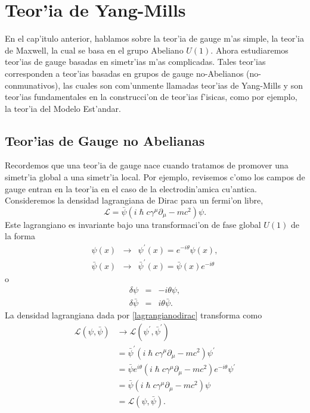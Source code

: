 \chapter{Teor'ia de Yang-Mills}
En el cap'itulo anterior, hablamos sobre la teor'ia de gauge m'as simple, la teor'ia de Maxwell, la cual se basa en el grupo Abeliano $U(1)$.
Ahora estudiaremos teor'ias de gauge basadas en simetr'ias m'as complicadas. Tales teor'ias corresponden a teor'ias basadas en grupos de gauge no-Abelianos (no-conmunativos), las cuales son com'unmente llamadas teor'ias de Yang-Mills y son teor'ias fundamentales en la construcci'on de teor'ias f'isicas, como por ejemplo, la teor'ia del Modelo Est'andar.
\section{Teor'ias de Gauge no Abelianas}
Recordemos que una teor'ia de gauge  nace cuando tratamos de promover una simetr'ia global a una simetr'ia local. Por ejemplo, revisemos c'omo los campos de gauge entran en la teor'ia en el caso de la electrodin'amica cu'antica.
Consideremos  la densidad lagrangiana de Dirac para un fermi'on libre,
\begin{equation}
\mathcal{L}=\bar{\psi}\left(i\hslash c\gamma^\mu \partial_\mu -mc^2\right)\psi. \label{lagrangianodirac}
\end{equation}
Este lagrangiano es invariante bajo una transformaci'on de fase global $U(1)$ de la forma
\begin{eqnarray}
\psi(x)&\rightarrow & \psi^\prime (x)=e^{-i\theta}\psi(x), \\
\bar{\psi}(x)&\rightarrow & \bar{\psi}^\prime (x)=\bar{\psi}(x) e^{-i\theta}
\end{eqnarray}
o
\begin{eqnarray}
\delta \psi&=&-i\theta \psi, \\
\delta\bar{\psi}&=&i\theta\bar{\psi}.
\end{eqnarray}
La densidad  lagrangiana dada por \eqref{lagrangianodirac} transforma como
\begin{equation}
\begin{aligned}
\mathcal{L}(\psi ,\bar{\psi})&\rightarrow  \mathcal{L}(\psi^\prime,\bar{\psi}^\prime) \\
&=\bar{\psi}^\prime\left(i\hslash c\gamma^\mu \partial_\mu -mc^2\right)\psi^\prime \\
&=\bar{\psi}e^{i\theta}\left(i\hslash c\gamma^\mu \partial_\mu -mc^2\right)e^{-i\theta}\psi^\prime \\
&=\bar{\psi}\left(i\hslash c\gamma^\mu \partial_\mu -mc^2\right)\psi \\
&=\mathcal{L}(\psi,\bar{\psi}).
\end{aligned}
\end{equation} 

